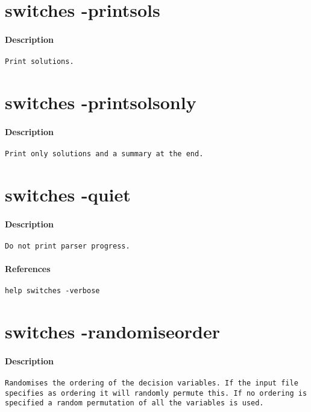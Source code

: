 \section{switches -printsols}
\paragraph{Description}
{\footnotesize
\begin{verbatim}
Print solutions.
\end{verbatim}
}
\section{switches -printsolsonly}
\paragraph{Description}
{\footnotesize
\begin{verbatim}
Print only solutions and a summary at the end.
\end{verbatim}
}
\section{switches -quiet}
\paragraph{Description}
{\footnotesize
\begin{verbatim}
Do not print parser progress.
\end{verbatim}
}
\paragraph{References}
{\footnotesize
\begin{verbatim}
help switches -verbose
\end{verbatim}
}
\section{switches -randomiseorder}
\paragraph{Description}
{\footnotesize
\begin{verbatim}
Randomises the ordering of the decision variables. If the input file
specifies as ordering it will randomly permute this. If no ordering is
specified a random permutation of all the variables is used.
\end{verbatim}
}
